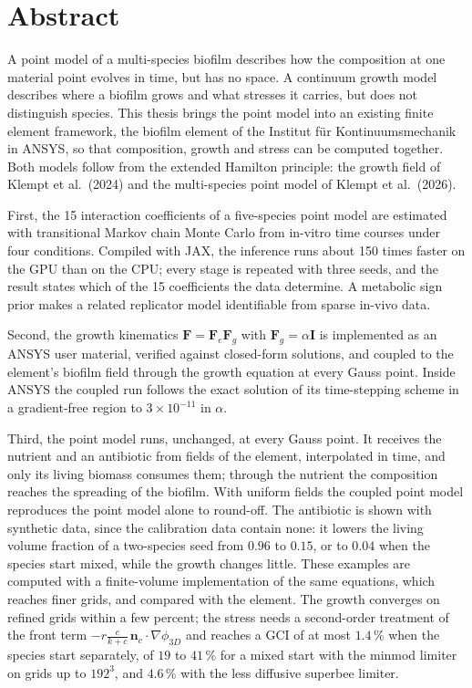\documentclass[12pt, a4paper, twoside]{report}
\newcommand{\bF}{\mathbf{F}}
\newcommand{\bI}{\mathbf{I}}
\newcommand{\fterm}{\ensuremath{-r\tfrac{c}{k+c}\,\mathbf n_c\cdot\nabla\phi_{3D}}}
\begin{document}
\chapter*{Abstract}
A point model of a multi-species biofilm describes how the composition at one
material point evolves in time, but has no space. A continuum growth model
describes where a biofilm grows and what stresses it carries, but does not
distinguish species. This thesis brings the point model into an existing finite
element framework, the biofilm element of the Institut für Kontinuumsmechanik
in ANSYS, so that composition, growth and stress can be computed together. Both
models follow from the extended Hamilton principle: the growth field of Klempt
et al.\ (2024) and the multi-species point model of Klempt et al.\ (2026).

First, the 15 interaction coefficients of a five-species point model are
estimated with transitional Markov chain Monte Carlo from in-vitro time courses
under four conditions. Compiled with JAX, the inference runs about 150 times
faster on the GPU than on the CPU; every stage is repeated with three seeds, and
the result states which of the 15 coefficients the data determine. A metabolic sign prior
makes a related replicator model identifiable from sparse in-vivo data.

Second, the growth kinematics $\bF=\bF_e\bF_g$ with $\bF_g=\alpha\bI$ is
implemented as an ANSYS user material, verified against closed-form solutions,
and coupled to the element's biofilm field through the growth equation at
every Gauss point. Inside ANSYS the coupled run follows the exact solution of
its time-stepping scheme in a gradient-free region to $3\times10^{-11}$ in $\alpha$.

Third, the point model runs, unchanged, at every Gauss point. It receives the
nutrient and an antibiotic from fields of the element, interpolated in time, and
only its living biomass consumes them; through the nutrient the composition
reaches the spreading of the biofilm. With uniform fields the coupled point model
reproduces the point model alone to round-off. The antibiotic is shown with
synthetic data, since the calibration data contain none: it lowers the living
volume fraction of a two-species seed from $0.96$ to $0.15$, or to $0.04$ when the
species start mixed, while the growth changes little. These examples are computed
with a finite-volume implementation of the same equations, which reaches finer
grids, and compared with the element. The growth converges on
refined grids within a few percent; the stress needs a second-order treatment
of the front term \fterm{} and reaches a GCI of at most $1.4\,\%$ when the species start separately, of $19$ to $41\,\%$ for a mixed start with the minmod limiter on grids up to $192^3$, and $4.6\,\%$ with the less diffusive superbee limiter.
\end{document}
